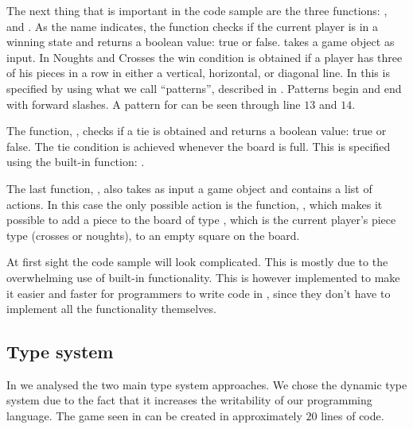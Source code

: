 
The next thing that is important in the code sample are the three functions: 
,  and . 
As the name indicates, the function  checks if the current player
is in a winning state and returns a boolean value: true or false.
 takes a game object as input. In Noughts and Crosses the
win condition is obtained if a player has three of his pieces in a row in
either a vertical, horizontal, or diagonal line. In \productname{} this is
specified by using what we call ``patterns'', described in
. Patterns begin and end with forward slashes. A pattern for
 can be seen through line $13$ and $14$.

The function, , checks if a tie is obtained and
returns a boolean value: true or false. The tie condition is achieved whenever
the board is full. This is specified using the built-in function:
. 

The last function, , also takes as input a game object and
contains a list of actions. In this case the only possible action is the
function, , which makes it possible to add a piece to the
board of type , which is the current player's piece type (crosses
or noughts), to an empty square on the board.

At first sight the code sample will look complicated. This is mostly due to the
overwhelming use of built-in functionality. This is however implemented to make
it easier and faster for programmers to write code in \productname{}, since they
don't have to implement all the functionality themselves.

\subsection*{Type system}

In  we analysed the two main type system
approaches. We chose the dynamic type system due to the fact that it increases
the writability of our programming language. The game seen in 
can be created in approximately $20$ lines of code.

